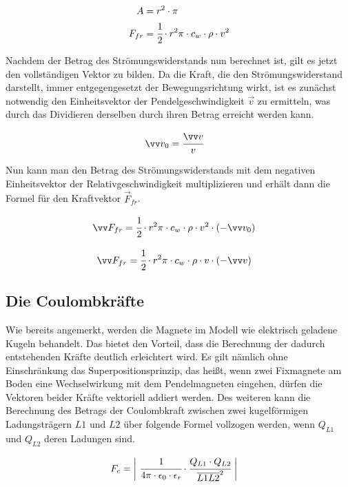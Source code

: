 \begin{align*}
    A &= r^2 \cdot \pi \\
    F_{fr} &= \cfrac{1}{2} \cdot r^2 \pi \cdot c_{w} \cdot \rho \cdot v^2
\end{align*}

Nachdem der Betrag des Strömungswiderstands nun berechnet ist, gilt es jetzt den vollständigen Vektor zu bilden. Da die Kraft, die den Strömungswiderstand darstellt, immer entgegengesetzt der Bewegungsrichtung wirkt, ist es zunächst notwendig den Einheitsvektor der Pendelgeschwindigkeit $\vec{v}$ zu ermitteln, was durch das Dividieren derselben durch ihren Betrag erreicht werden kann.

\begin{align*}
    \vec{v}_{0} &= \cfrac{\vec{v}}{v}
\end{align*}

Nun kann man den Betrag des Strömungswiderstands mit dem negativen Einheitsvektor der Relativgeschwindigkeit multiplizieren und erhält dann die Formel für den Kraftvektor $\vec{F}_{fr}$.

\begin{align*}
    \vec{F}_{fr} &= \cfrac{1}{2} \cdot r^2 \pi \cdot c_{w} \cdot \rho \cdot v^2 \cdot \left(- \vec{v}_{0} \right)
\end{align*}

\begin{align} \label{f_fr}
    \vec{F}_{fr} &= \cfrac{1}{2} \cdot r^2 \pi \cdot c_{w} \cdot \rho \cdot v \cdot (-\vec{v})
\end{align}


\subsection{Die Coulombkräfte}
\label{ssec:die_coulombkräfte}

Wie bereits angemerkt, werden die Magnete im Modell wie elektrisch geladene Kugeln behandelt. Das bietet den Vorteil, dass die Berechnung der dadurch entstehenden Kräfte deutlich erleichtert wird. Es gilt nämlich ohne Einschränkung das Superpositionsprinzip, das heißt, wenn zwei Fixmagnete am Boden eine Wechselwirkung mit dem Pendelmagneten eingehen, dürfen die Vektoren beider Kräfte vektoriell addiert werden. Des weiteren kann die Berechnung des Betrags der Coulombkraft zwischen zwei kugelförmigen Ladungsträgern $L1$ und $L2$ über folgende Formel vollzogen werden, wenn $Q_{L1}$ und $Q_{L2}$ deren Ladungen sind.

\begin{align*}
    F_{c} &= \bigg\vert\  \cfrac{1}{4\pi \cdot \epsilon_{0} \cdot \epsilon_{r}} \cdot \cfrac{Q_{L1} \cdot Q_{L2}}{\overline{L1L2}^2}\  \bigg\vert
\end{align*}

